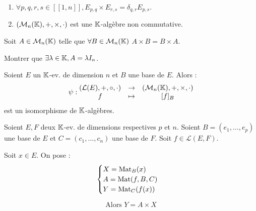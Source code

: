 \documentclass[12pt, a4paper]{report}
\begin{document}
\begin{remark}
    \begin{enumerate}
        \item $\forall p,q,r,s \in [\![1,n]\!], E_{p,q} \times E_{r,s} = \delta_{q,r} E_{p,s}$.
        \item $(\mathcal M_n(\mathbb{K}),+,\times,\cdot)$ est une $\mathbb{K}$-algèbre non commutative.
    \end{enumerate}
\end{remark}

\begin{exercise}
    Soit $A \in \mathcal M_n(\mathbb{K})$ telle que $\forall B \in \mathcal M_n(\mathbb{K})$ $A\times B = B \times A$.

    Montrer que $\exists \lambda \in \mathbb{K}, A = \lambda I_n$.
\end{exercise}

\begin{property}
    Soient $E$ un $\mathbb{K}$-ev. de dimension $n$ et $B$ une base de $E$. Alors :
    $$\psi : \begin{matrix} (\mathcal L(E),+,\circ,\cdot) &\to &(\mathcal M_n(\mathbb{K}),+, \times, \cdot) \\ f &\mapsto &[f]_B \end{matrix}$$
    est un isomorphisme de $\mathbb{K}$-algèbres.
\end{property}

\begin{property}
    Soient $E,F$ deux $\mathbb{K}$-ev. de dimensions respectives $p$ et $n$. Soient $B=(e_1,\ldots,e_p)$ une base de $E$ et $C=(c_1,\ldots,c_n)$ une base de $F$. Soit $f \in \mathcal L(E,F)$.

    Soit $x \in E$. On pose :
    $$\begin{cases}
    X = \mathrm{Mat}_B(x)\\
    A = \mathrm{Mat}(f,B,C)\\
    Y = \mathrm{Mat}_C(f(x))
    \end{cases}$$

    $$\text{Alors } Y = A \times X$$
\end{property}
\end{document}

